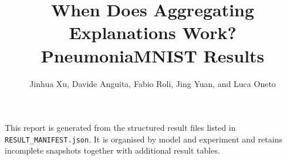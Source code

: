\documentclass[10pt,a4paper]{article}
\title{When Does Aggregating Explanations Work?\\\large PneumoniaMNIST Results}
\author{Jinhua Xu, Davide Anguita, Fabio Roli, Jing Yuan, and Luca Oneto}
\date{}
\begin{document}
\maketitle

\noindent
This report is generated from the structured result files listed in
\texttt{RESULT\_MANIFEST.json}. It is organised by model and experiment
and retains incomplete snapshots together with additional result tables.


\end{document}
